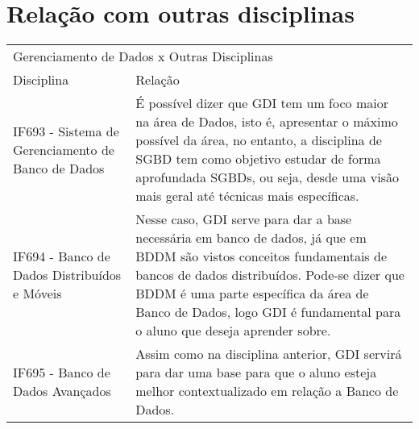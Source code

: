 \documentclass[10pt]{article}
\begin{document}
\section{Relação com outras disciplinas}

\begin{table}[h]
 \centering
 {\renewcommand\arraystretch{1.25}
 \begin{tabular}{ l l }
  \cline{1-1}\cline{2-2}  
    \multicolumn{2}{|p{12cm}|}{Gerenciamento de Dados x Outras Disciplinas \centering }
  \\ 
  \cline{1-1}\cline{2-2}  
    \multicolumn{1}{|p{5cm}|}{Disciplina \centering } &
    \multicolumn{1}{p{7cm}|}{Relação \centering }
  \\ 
  \cline{1-1}\cline{2-2}  
    \multicolumn{1}{|p{5cm}|}{IF693 -  Sistema de Gerenciamento de Banco de Dados \centering } &
    \multicolumn{1}{p{7cm}|}{É possível dizer que GDI tem um foco maior na área de Dados, isto é, apresentar o máximo possível da área, no entanto, a disciplina de SGBD tem como objetivo estudar de forma aprofundada SGBDs, ou seja, desde uma visão mais geral até técnicas mais específicas.}
  \\ 
  \cline{1-1}\cline{2-2}  
    \multicolumn{1}{|p{5cm}|}{IF694 - Banco de Dados Distribuídos e Móveis \centering } &
    \multicolumn{1}{p{7cm}|}{Nesse caso, GDI serve para dar a base necessária em banco de dados, já que em BDDM são vistos conceitos fundamentais de bancos de dados distribuídos. Pode-se dizer que BDDM é uma parte específica da área de Banco de Dados, logo GDI é fundamental para o aluno que deseja aprender sobre. }
  \\
  \cline{1-1}\cline{2-2}  
    \multicolumn{1}{|p{5cm}|}{IF695 - Banco de Dados Avançados \centering } &
    \multicolumn{1}{p{7cm}|}{Assim como na disciplina anterior, GDI servirá para dar uma base para que o aluno esteja melhor contextualizado em relação a Banco de Dados.}
  \\ 
  \hline
\end{tabular}}
\end{table}



\end{document}
